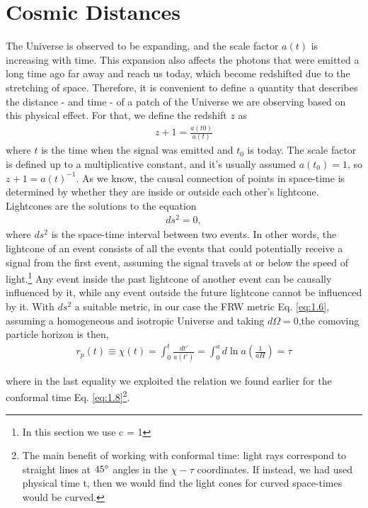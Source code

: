 \section{Cosmic Distances} 
 The Universe is observed to be expanding, and the scale factor $a(t)$ is increasing with time. This expansion also affects the photons that were emitted a long time ago far away and reach us today, which become redshifted due to the stretching of space. Therefore, it is convenient to define a quantity that describes the distance - and time - of a patch of the Universe we are observing based on this physical effect. For that, we define the redshift $z$ as
\begin{align}
    z+1 = \frac{a(t0)}{a(t)}
\end{align}
where $t$ is the time when the signal was emitted and $t_0$ is today. The scale factor is defined up to a multiplicative constant, and it's usually assumed $a(t_0) = 1$, so $z + 1 = a(t)^{-1}$.
As we know, the causal connection of points in space-time is determined by whether they are inside or outside each other's lightcone. Lightcones are the solutions to the equation
\begin{align}
ds^2 = 0,
\end{align}
where $ds^2$ is the space-time interval between two events. In other words, the lightcone of an event consists of all the events that could potentially receive a signal from the first event, assuming the signal travels at or below the speed of light.\footnote{In this section we use c = 1} Any event inside the past lightcone of another event can be causally influenced by it, while any event outside the future lightcone cannot be influenced by it.
With $ds^2$ a suitable metric, in our case the FRW metric Eq. \eqref{eq:1.6}, assuming a homogeneous and isotropic Universe and taking $d\Omega=0$,the comoving particle horizon is then, 
\begin{align}
    r_p(t) \equiv \chi(t) = \int_0^t \frac{ dt'}{a(t')} =  \int_0^a d\ln{a}\left(\frac{1}{aH}\right) = \tau \label{eq:1.28}
\end{align}

where in the last equality we exploited the relation we found earlier for the conformal time  Eq. \eqref{eq:1.8}\footnote{The main benefit of working with conformal time: light rays correspond to straight lines at $45 \degree$ angles in the $\chi - \tau$ coordinates. If instead, we had used physical time t, then we would find the light cones for curved space-times would be curved.}.

